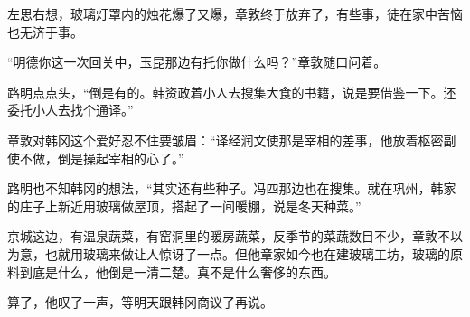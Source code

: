 左思右想，玻璃灯罩内的烛花爆了又爆，章敦终于放弃了，有些事，徒在家中苦恼也无济于事。

“明德你这一次回关中，玉昆那边有托你做什么吗？”章敦随口问着。

路明点点头，“倒是有的。韩资政着小人去搜集大食的书籍，说是要借鉴一下。还委托小人去找个通译。”

章敦对韩冈这个爱好忍不住要皱眉：“译经润文使那是宰相的差事，他放着枢密副使不做，倒是操起宰相的心了。”

路明也不知韩冈的想法，“其实还有些种子。冯四那边也在搜集。就在巩州，韩家的庄子上新近用玻璃做屋顶，搭起了一间暖棚，说是冬天种菜。”

京城这边，有温泉蔬菜，有窑洞里的暖房蔬菜，反季节的菜蔬数目不少，章敦不以为意，也就用玻璃来做让人惊讶了一点。但他章家如今也在建玻璃工坊，玻璃的原料到底是什么，他倒是一清二楚。真不是什么奢侈的东西。

算了，他叹了一声，等明天跟韩冈商议了再说。

